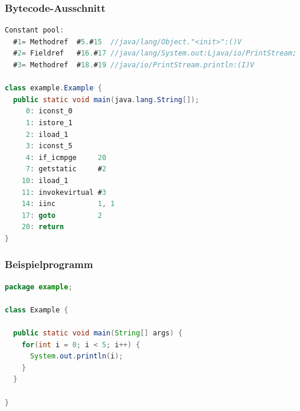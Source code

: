 \documentclass[10pt]{beamer}
\begin{document}

\begin{frame}[fragile]
\frametitle{Bytecode-Ausschnitt}
\begin{lstlisting}[language=Java]
Constant pool:
  #1= Methodref  #5.#15  //java/lang/Object."<init>":()V
  #2= Fieldref   #16.#17 //java/lang/System.out:Ljava/io/PrintStream;
  #3= Methodref  #18.#19 //java/io/PrintStream.println:(I)V

class example.Example {
  public static void main(java.lang.String[]);
     0: iconst_0      
     1: istore_1      
     2: iload_1       
     3: iconst_5      
     4: if_icmpge     20
     7: getstatic     #2
    10: iload_1       
    11: invokevirtual #3
    14: iinc          1, 1
    17: goto          2
    20: return        
}
\end{lstlisting}
\end{frame}


\begin{frame}[fragile]
\frametitle{Beispielprogramm}
\begin{lstlisting}[language=Java]
package example;

class Example {
  
  public static void main(String[] args) {
    for(int i = 0; i < 5; i++) {
      System.out.println(i);
    }
  }

}
\end{lstlisting}
\end{frame}

\end{document}
